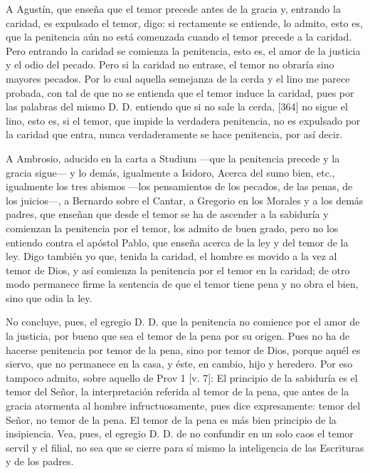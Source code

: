 A Agustín, que enseña que el temor precede antes de la gracia y, entrando la caridad, es expulsado el temor, digo: si rectamente se entiende, lo admito, esto es, que la penitencia aún no está comenzada cuando el temor precede a la caridad. Pero entrando la caridad se comienza la penitencia, esto es, el amor de la justicia y el odio del pecado. Pero si la caridad no entrase, el temor no obraría sino mayores pecados. Por lo cual aquella semejanza de la cerda y el lino me parece probada, con tal de que no se entienda que el temor induce la caridad, pues por las palabras del mismo D. D. entiendo que si no sale la cerda, [364] no sigue el lino, esto es, si el temor, que impide la verdadera penitencia, no es expulsado por la caridad que entra, nunca verdaderamente se hace penitencia, por así decir.

A Ambrosio, aducido en la carta a Studium —que la penitencia precede y la gracia sigue— y lo demás, igualmente a Isidoro, Acerca del sumo bien, etc., igualmente los tres abismos —los pensamientos de los pecados, de las penas, de los juicios—, a Bernardo sobre el Cantar, a Gregorio en los Morales y a los demás padres, que enseñan que desde el temor se ha de ascender a la sabiduría y comienzan la penitencia por el temor, los admito de buen grado, pero no los entiendo contra el apóstol Pablo, que enseña acerca de la ley y del temor de la ley. Digo también yo que, tenida la caridad, el hombre es movido a la vez al temor de Dios, y así comienza la penitencia por el temor en la caridad; de otro modo permanece firme la sentencia de que el temor tiene pena y no obra el bien, sino que odia la ley.

No concluye, pues, el egregio D. D. que la penitencia no comience por el amor de la justicia, por bueno que sea el temor de la pena por su origen. Pues no ha de hacerse penitencia por temor de la pena, sino por temor de Dios, porque aquél es siervo, que no permanece en la casa, y éste, en cambio, hijo y heredero. Por eso tampoco admito, sobre aquello de Prov 1 [v. 7]: El principio de la sabiduría es el temor del Señor, la interpretación referida al temor de la pena, que antes de la gracia atormenta al hombre infructuosamente, pues dice expresamente: temor del Señor, no temor de la pena. El temor de la pena es más bien principio de la insipiencia. Vea, pues, el egregio D. D. de no confundir en un solo caos el temor servil y el filial, no sea que se cierre para sí mismo la inteligencia de las Escrituras y de los padres.

